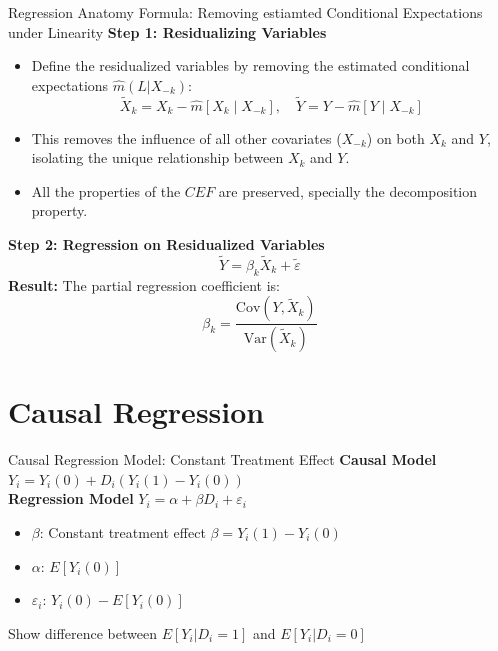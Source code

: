 \documentclass[xcolor=svgnames,t]{beamer}
\begin{document}
\begin{frame}{Regression Anatomy Formula: Removing estiamted Conditional Expectations under Linearity}
    \textbf{Step 1: Residualizing Variables}
    \begin{itemize}
        \item Define the residualized variables by removing the estimated conditional expectations $\hat{m}(L|X_{-k})$:
        \[
        \tilde{X}_k = X_k - \hat{m}[X_k \mid X_{-k}], \quad \tilde{Y} = Y - \hat{m}[Y \mid X_{-k}]
        \]
        \item This removes the influence of all other covariates (\(X_{-k}\)) on both \(X_k\) and \(Y\), isolating the unique relationship between \(X_k\) and \(Y\).
        \item All the properties of the $CEF$ are preserved, specially the decomposition property.
    \end{itemize}
    \pause
    \textbf{Step 2: Regression on Residualized Variables}
    \[
    \tilde{Y} = \beta_k \tilde{X}_k + \tilde{\varepsilon}
    \]
    \pause
    \textbf{Result:}
    The partial regression coefficient is:
    \[
    \beta_k = \frac{\text{Cov}(Y, \tilde{X}_k)}{\text{Var}(\tilde{X}_k)}
    \]
    
\end{frame}




\section{Causal Regression}

\begin{frame}{Causal Regression Model: Constant Treatment Effect}
    \textbf{Causal Model} $Y_i = Y_i(0) + D_i(Y_i(1) - Y_i(0))$\\
    \pause
    \textbf{Regression Model} $Y_i = \alpha + \beta D_i + \varepsilon_i$
 \pause
    \begin{itemize}
        \item \(\beta\): Constant treatment effect $\beta=Y_i(1)-Y_i(0)$
        \item \(\alpha\): $E[Y_i(0)] $
        \item \(\varepsilon_i\): $Y_i(0)-E[Y_i(0)] $
    \end{itemize}
    \pause
    Show difference between $E[Y_i|D_i=1]$ and $E[Y_i|D_i=0]$
    

   
\end{frame}
\end{document}
